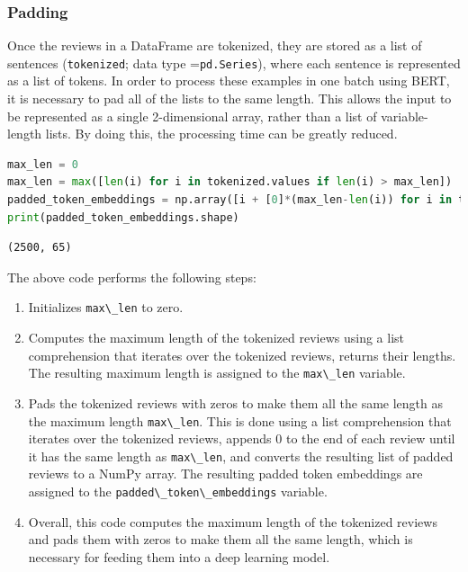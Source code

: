 \subsubsection{Padding}\label{padding}

Once the reviews in a DataFrame are tokenized, they are stored as a list
of sentences (\lstinline{tokenized}; data type
=\lstinline{pd.Series}), where each sentence is
represented as a list of tokens. In order to process these examples in
one batch using BERT, it is necessary to pad all of the lists to the
same length. This allows the input to be represented as a single
2-dimensional array, rather than a list of variable-length lists. By
doing this, the processing time can be greatly reduced.

\begin{lstlisting}[language=Python]
max_len = 0
max_len = max([len(i) for i in tokenized.values if len(i) > max_len])
padded_token_embeddings = np.array([i + [0]*(max_len-len(i)) for i in tokenized.values])
print(padded_token_embeddings.shape)
\end{lstlisting}

\begin{lstlisting}
(2500, 65)
\end{lstlisting}

The above code performs the following steps:

\begin{enumerate}
\def\labelenumi{\arabic{enumi}.}
\item
  Initializes \lstinline{max\_len} to zero.
\item
  Computes the maximum length of the tokenized reviews using a list
  comprehension that iterates over the tokenized reviews, returns their
  lengths. The resulting maximum length is assigned to the
  \lstinline{max\_len} variable.
\item
  Pads the tokenized reviews with zeros to make them all the same length
  as the maximum length \lstinline{max\_len}. This is done
  using a list comprehension that iterates over the tokenized reviews,
  appends 0 to the end of each review until it has the same length as
  \lstinline{max\_len}, and converts the resulting list of
  padded reviews to a NumPy array. The resulting padded token embeddings
  are assigned to the
  \lstinline{padded\_token\_embeddings} variable.
\item
  Overall, this code computes the maximum length of the tokenized
  reviews and pads them with zeros to make them all the same length,
  which is necessary for feeding them into a deep learning model.
\end{enumerate}

